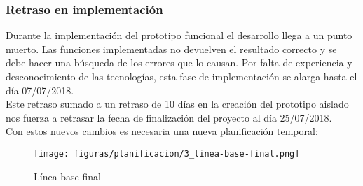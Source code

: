 \subsubsection{Retraso en implementación}

Durante la implementación del prototipo funcional el desarrollo llega a un punto muerto. Las funciones implementadas no devuelven el resultado correcto y se debe hacer una búsqueda de los errores que lo causan. Por falta de experiencia y desconocimiento de las tecnologías, esta fase de implementación se alarga hasta el día 07/07/2018. \\

Este retraso sumado a un retraso de 10 días en la creación del prototipo aislado nos fuerza a retrasar la fecha de finalización del proyecto al día 25/07/2018. \\

Con estos nuevos cambios es necesaria una nueva planificación temporal:

\begin{figure}[H]
    \centerline{\texttt{[image: figuras/planificacion/3\_linea-base-final.png]}}
    \caption{Línea base final}
\end{figure}

